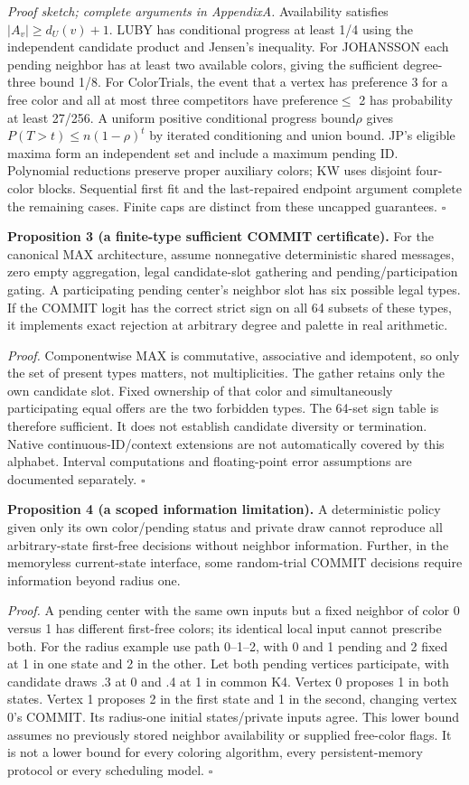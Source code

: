 \documentclass[
  11pt,
]{article}
\begin{document}
\emph{Proof sketch; complete arguments in AppendixA.} Availability
satisfies \(|A_v|\ge d_U(v)+1\). LUBY has conditional progress at least
1/4 using the independent candidate product and Jensen's inequality. For
JOHANSSON each pending neighbor has at least two available colors,
giving the sufficient degree-three bound 1/8. For ColorTrials, the event
that a vertex has preference 3 for a free color and all at most three
competitors have preference\(\le\) 2 has probability at least 27/256. A
uniform positive conditional progress bound\(\rho\) gives
\(P(T>t)\le n(1-\rho)^t\) by iterated conditioning and union bound. JP's
eligible maxima form an independent set and include a maximum pending
ID. Polynomial reductions preserve proper auxiliary colors; KW uses
disjoint four-color blocks. Sequential first fit and the last-repaired
endpoint argument complete the remaining cases. Finite caps are distinct
from these uncapped guarantees. \(\square\)

\textbf{Proposition 3 (a finite-type sufficient COMMIT certificate).}
For the canonical MAX architecture, assume nonnegative deterministic
shared messages, zero empty aggregation, legal candidate-slot gathering
and pending/participation gating. A participating pending center's
neighbor slot has six possible legal types. If the COMMIT logit has the
correct strict sign on all 64 subsets of these types, it implements
exact rejection at arbitrary degree and palette in real arithmetic.

\emph{Proof.} Componentwise MAX is commutative, associative and
idempotent, so only the set of present types matters, not
multiplicities. The gather retains only the own candidate slot. Fixed
ownership of that color and simultaneously participating equal offers
are the two forbidden types. The 64-set sign table is therefore
sufficient. It does not establish candidate diversity or termination.
Native continuous-ID/context extensions are not automatically covered by
this alphabet. Interval computations and floating-point error
assumptions are documented separately. \(\square\)

\textbf{Proposition 4 (a scoped information limitation).} A
deterministic policy given only its own color/pending status and private
draw cannot reproduce all arbitrary-state first-free decisions without
neighbor information. Further, in the memoryless current-state
interface, some random-trial COMMIT decisions require information beyond
radius one.

\emph{Proof.} A pending center with the same own inputs but a fixed
neighbor of color 0 versus 1 has different first-free colors; its
identical local input cannot prescribe both. For the radius example use
path 0--1--2, with 0 and 1 pending and 2 fixed at 1 in one state and 2
in the other. Let both pending vertices participate, with candidate
draws .3 at 0 and .4 at 1 in common K4. Vertex 0 proposes 1 in both
states. Vertex 1 proposes 2 in the first state and 1 in the second,
changing vertex 0's COMMIT. Its radius-one initial states/private inputs
agree. This lower bound assumes no previously stored neighbor
availability or supplied free-color flags. It is not a lower bound for
every coloring algorithm, every persistent-memory protocol or every
scheduling model. \(\square\)
\end{document}

